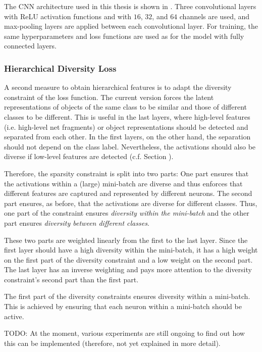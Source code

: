 The CNN architecture used in this thesis is shown in .
Three convolutional layers with ReLU activation functions and with $16$, $32$, and $64$ channels are used, and max-pooling layers are applied between each convolutional layer. For training, the same hyperparameters and loss functions are used as for the model with fully connected layers.

\subsubsection{Hierarchical Diversity Loss}
A second measure to obtain hierarchical features is to adapt the diversity constraint of the loss function. The current version forces the latent representations of objects of the same class to be similar and those of different classes to be different. This is useful in the last layers, where high-level features (i.e. high-level net fragments) or object representations should be detected and separated from each other. In the first layers, on the other hand, the separation should not depend on the class label. Nevertheless, the activations should also be diverse if low-level features are detected (c.f. Section ).

Therefore, the sparsity constraint is split into two parts: One part ensures that the activations within a (large) mini-batch are diverse and thus enforces that different features are captured and represented by different neurons. The second part ensures, as before, that the activations are diverse for different classes. Thus, one part of the constraint ensures \emph{diversity within the mini-batch} and the other part ensures \emph{diversity between different classes}.

These two parts are weighted linearly from the first to the last layer. Since the first layer should have a high diversity within the mini-batch, it has a high weight on the first part of the diversity constraint and a low weight on the second part. The last layer has an inverse weighting and pays more attention to the diversity constraint's second part than the first part.

The first part of the diversity constraints ensures diversity within a mini-batch. This is achieved by ensuring that each neuron within a mini-batch should be active. 

TODO: At the moment, various experiments are still ongoing to find out how this can be implemented (therefore, not yet explained in more detail).


